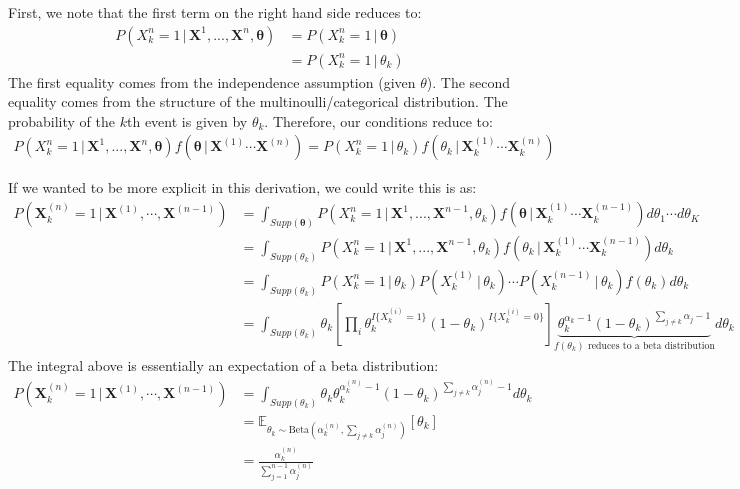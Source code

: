 \documentclass[submit]{harvardml}
\newcommand{\given}{\,|\,}
\newcommand{\E}{\mathbb{E}}
\renewcommand{\v}{\boldsymbol}
\begin{document}
\begin{enumerate}[label=(\alph*)]
	First, we note that the first term on the right hand side reduces to:
		\begin{align*}
		 	P(X^{n}_k = 1 \given \v{X}^{1}, ...	, \v{X}^{n}, \v{\theta}) &= P(X^{n}_k = 1 \given \v{\theta}) \\
		 	&= P(X^{n}_k = 1 \given \theta_k)
		\end{align*}
		The first equality comes from the independence assumption (given $\theta$). The second equality comes from the structure of the multinoulli/categorical distribution. The probability of the $k$th event is given by $\theta_k$. Therefore, our conditions reduce to:
		\begin{align*}
		P(X^{n}_k = 1 \given \v{X}^{1}, ...	, \v{X}^{n}, \v{\theta}) f(\v{\theta} \given \v{X}^{(1)} \cdots \v{X}^{(n)}) = P(X^{n}_k = 1 \given \theta_k) f(\theta_k \given \v{X}^{(1)}_k \cdots \v{X}^{(n)}_k)
		\end{align*}
		
		If we wanted to be more explicit in this derivation, we could write this is as:
		\begin{align*}
		 P(\v{X}^{(n)}_{k} = 1 \given \v{X}^{(1)}, \cdots, \v{X}^{(n-1)}) &= \int_{Supp(\v{\theta})} {P(X^{n}_k = 1 \given \v{X}^{1}, ...	, \v{X}^{n-1}, \theta_k) f(\v{\theta} \given \v{X}^{(1)}_k \cdots \v{X}^{(n-1)}_k) d\theta_1 \cdots d\theta_K} \\
		 &= \int_{Supp(\theta_k)} {P(X^{n}_k = 1 \given \v{X}^{1}, ...	, \v{X}^{n-1}, \theta_k) f(\theta_k \given \v{X}^{(1)}_k \cdots \v{X}^{(n-1)}_k) d\theta_k} \\
		 &= \int_{Supp(\theta_k)} P(X^{n}_k = 1 \given \theta_k) P(X^{(1)}_k \given \theta_k) \cdots P(X^{(n-1)}_k \given \theta_k) f(\theta_k) d\theta_k \\
		 &= \int_{Supp(\theta_k)} {\theta_k \left[\prod_i \theta_k ^ {I\{X^{(i)}_k = 1\}} (1 - \theta_k)^{I\{X^{(i)}_k = 0\}}  \right] \underbrace{\theta_k^{\alpha_k-1} (1 - \theta_k)^{\sum_{j \neq k} \alpha_j - 1}}_{\text{$f(\theta_k)$ reduces to a beta distribution}} d\theta_k}
		\end{align*}
		The integral above is essentially an expectation of a beta distribution:
		\begin{align*}
			P(\v{X}^{(n)}_{k} = 1 \given \v{X}^{(1)}, \cdots, \v{X}^{(n-1)}) &= \int_{Supp(\theta_k)} {\theta_k \theta_k^{\alpha^{(n)}_k - 1} (1-\theta_k)^{\sum_{j \neq k} \alpha^{(n)}_j - 1} d\theta_k}\\
			&= \E_{\theta_k \sim \text{Beta}\left(\alpha^{(n)}_k, \sum_{j \neq k} \alpha^{(n)}_j \right)} \left[\theta_k \right] \\
			&= \frac{\alpha^{(n)}_k}{\sum_{j=1}^{n-1} \alpha^{(n)}_j}
		\end{align*}
		

\end{enumerate}
\end{document}
